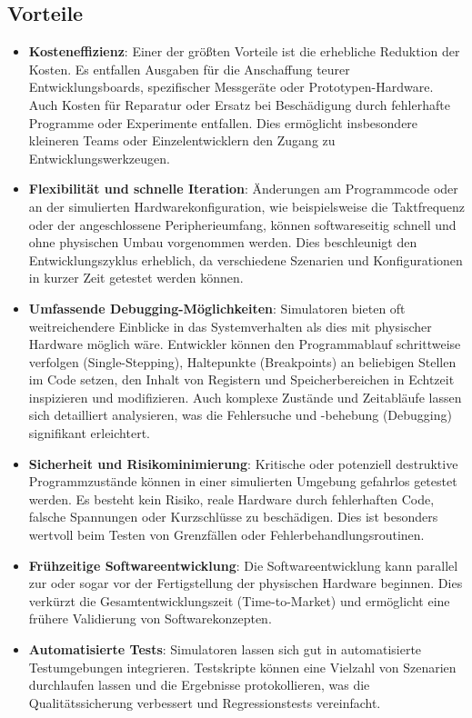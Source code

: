 \subsection*{Vorteile}
\begin{itemize}
    \item \textbf{Kosteneffizienz}: Einer der größten Vorteile ist die erhebliche Reduktion der Kosten. Es entfallen Ausgaben für die Anschaffung teurer Entwicklungsboards, spezifischer Messgeräte oder Prototypen-Hardware. Auch Kosten für Reparatur oder Ersatz bei Beschädigung durch fehlerhafte Programme oder Experimente entfallen. Dies ermöglicht insbesondere kleineren Teams oder Einzelentwicklern den Zugang zu Entwicklungswerkzeugen.
    \item \textbf{Flexibilität und schnelle Iteration}: Änderungen am Programmcode oder an der simulierten Hardwarekonfiguration, wie beispielsweise die Taktfrequenz oder der angeschlossene Peripherieumfang, können softwareseitig schnell und ohne physischen Umbau vorgenommen werden. Dies beschleunigt den Entwicklungszyklus erheblich, da verschiedene Szenarien und Konfigurationen in kurzer Zeit getestet werden können.
    \item \textbf{Umfassende Debugging-Möglichkeiten}: Simulatoren bieten oft weitreichendere Einblicke in das Systemverhalten als dies mit physischer Hardware möglich wäre. Entwickler können den Programmablauf schrittweise verfolgen (Single-Stepping), Haltepunkte (Breakpoints) an beliebigen Stellen im Code setzen, den Inhalt von Registern und Speicherbereichen in Echtzeit inspizieren und modifizieren. Auch komplexe Zustände und Zeitabläufe lassen sich detailliert analysieren, was die Fehlersuche und -behebung (Debugging) signifikant erleichtert.
    \item \textbf{Sicherheit und Risikominimierung}: Kritische oder potenziell destruktive Programmzustände können in einer simulierten Umgebung gefahrlos getestet werden. Es besteht kein Risiko, reale Hardware durch fehlerhaften Code, falsche Spannungen oder Kurzschlüsse zu beschädigen. Dies ist besonders wertvoll beim Testen von Grenzfällen oder Fehlerbehandlungsroutinen.
    \item \textbf{Frühzeitige Softwareentwicklung}: Die Softwareentwicklung kann parallel zur oder sogar vor der Fertigstellung der physischen Hardware beginnen. Dies verkürzt die Gesamtentwicklungszeit (Time-to-Market) und ermöglicht eine frühere Validierung von Softwarekonzepten.
    \item \textbf{Automatisierte Tests}: Simulatoren lassen sich gut in automatisierte Testumgebungen integrieren. Testskripte können eine Vielzahl von Szenarien durchlaufen lassen und die Ergebnisse protokollieren, was die Qualitätssicherung verbessert und Regressionstests vereinfacht.
\end{itemize}

